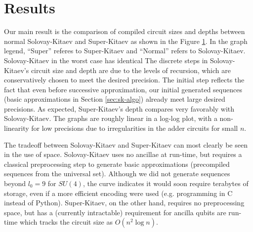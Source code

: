 \section{Results}
\label{sec:results}

Our main result is the comparison of compiled circuit sizes and depths between 
normal Solovay-Kitaev and Super-Kitaev as shown in the Figure
\ref{fig:size-depth}. In the graph legend, ``Super'' referes to Super-Kitaev
and ``Normal'' refers to Solovay-Kitaev.
Solovay-Kitaev in the worst case has identical
The discrete steps in Solovay-Kitaev's circuit size and depth are due
to the levels of recursion, which are conservatively chosen to meet
the desired precision. The initial step reflects the fact that even
before successive approximation, our initial generated sequences
(basic approximations in Section \ref{sec:sk-algo}) already meet large
desired precisions. As expected, Super-Kitaev's depth compares very
favorably with Solovay-Kitaev.
The graphs are roughly linear in a log-log plot, with a non-linearity
for low precisions due to irregularities in the adder circuits for small
$n$.

\begin{center}
\begin{figure}[h!]
\label{fig:size-depth}
\end{figure}
\end{center}

The tradeoff between Solovay-Kitaev and Super-Kitaev can most clearly
be seen in the use of space. Solovay-Kitaev uses no ancillae at run-time,
but requires a classical preprocessing step to generate basic
approximations (precompiled sequences from the universal set). Although
we did not generate sequences beyond $l_0 = 9$ for $SU(4)$, the curve
indicates it would soon require terabytes of storage, even if a more
efficient encoding were used (e.g. programming in C instead of Python).
Super-Kitaev, on the other hand, requires no preprocessing space, but
has a (currently intractable) requirement for ancilla qubits are run-time
which tracks the circuit size as $O(n^2 \log n)$.

\begin{center}
\begin{figure}[h!]
\label{fig:generation}
\end{figure}
\end{center}

\begin{center}
\begin{figure}[h!]
\label{fig:ancilla}
\end{figure}
\end{center}
